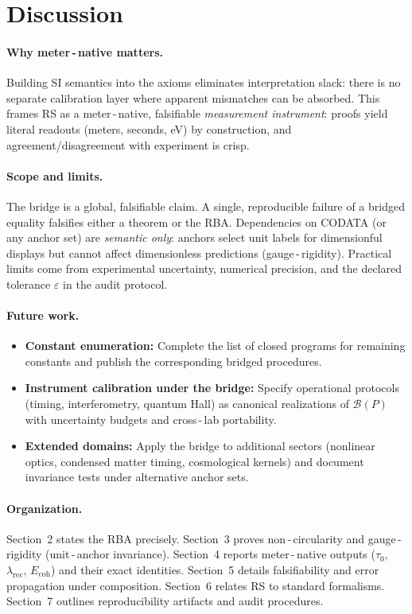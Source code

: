 \documentclass[11pt]{article}
\newcommand{\lamrec}{\lambda_{\mathrm{rec}}}
\newcommand{\tauzero}{\tau_{0}}
\newcommand{\Ecoh}{E_{\mathrm{coh}}}
\theoremstyle{remark}
\begin{document}
\section{Discussion}
\paragraph{Why meter\,\mbox{-}\,native matters.}
Building SI semantics into the axioms eliminates interpretation slack: there is no separate calibration layer where apparent mismatches can be absorbed. This frames RS as a meter\,\mbox{-}\,native, falsifiable \emph{measurement instrument}: proofs yield literal readouts (meters, seconds, eV) by construction, and agreement/disagreement with experiment is crisp.

\paragraph{Scope and limits.}
The bridge is a global, falsifiable claim. A single, reproducible failure of a bridged equality falsifies either a theorem or the RBA. Dependencies on CODATA (or any anchor set) are \emph{semantic only}: anchors select unit labels for dimensionful displays but cannot affect dimensionless predictions (gauge\,\mbox{-}\,rigidity). Practical limits come from experimental uncertainty, numerical precision, and the declared tolerance $\varepsilon$ in the audit protocol.

\paragraph{Future work.}
\begin{itemize}
  \item \textbf{Constant enumeration:} Complete the list of closed programs for remaining constants and publish the corresponding bridged procedures.
  \item \textbf{Instrument calibration under the bridge:} Specify operational protocols (timing, interferometry, quantum Hall) as canonical realizations of $\mathcal B(P)$ with uncertainty budgets and cross\,\mbox{-}\,lab portability.
  \item \textbf{Extended domains:} Apply the bridge to additional sectors (nonlinear optics, condensed matter timing, cosmological kernels) and document invariance tests under alternative anchor sets.
\end{itemize}

\paragraph{Organization.} Section~2 states the RBA precisely. Section~3 proves
non\,\mbox{-}\,circularity and gauge\,\mbox{-}\,rigidity (unit\,\mbox{-}\,anchor invariance). Section~4 reports meter\,\mbox{-}\,native
outputs ($\tauzero$, $\lamrec$, $\Ecoh$) and their exact identities. Section~5 details
falsifiability and error propagation under composition. Section~6 relates RS to
standard formalisms. Section~7 outlines reproducibility artifacts and audit
procedures.
\end{document}
